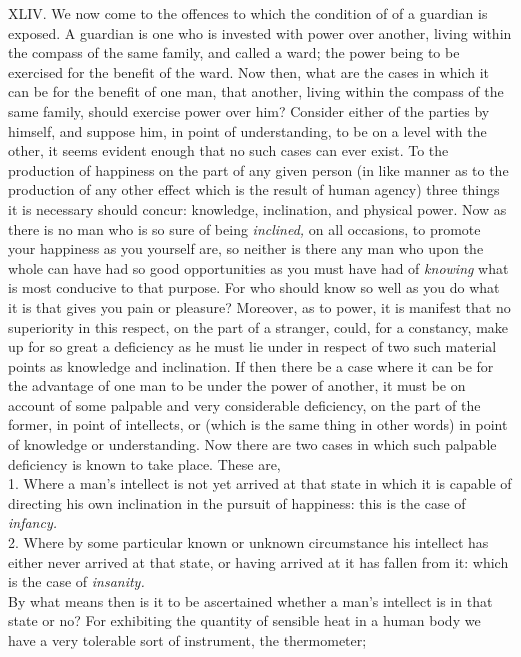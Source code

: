 \documentclass[12pt]{report}
\begin{document}
XLIV. We now come to the offences to which the condition of of a
guardian is exposed. A guardian is one who is invested with power over
another, living within the compass of the same family, and called a
ward; the power being to be exercised for the benefit of the ward. Now
then, what are the cases in which it can be for the benefit of one man,
that another, living within the compass of the same family, should
exercise power over him? Consider either of the parties by himself, and
suppose him, in point of understanding, to be on a level with the other,
it seems evident enough that no such cases can ever exist. To the
production of happiness on the part of any given person (in like manner
as to the production of any other effect which is the result of human
agency) three things it is necessary should concur: knowledge,
inclination, and physical power. Now as there is no man who is so sure
of being \emph{inclined,} on all occasions, to promote your happiness as
you yourself are, so neither is there any man who upon the whole can
have had so good opportunities as you must have had of \emph{knowing}
what is most conducive to that purpose. For who should know so well as
you do what it is that gives you pain or pleasure? Moreover, as to
power, it is manifest that no superiority in this respect, on the part
of a stranger, could, for a constancy, make up for so great a deficiency
as he must lie under in respect of two such material points as knowledge
and inclination. If then there be a case where it can be for the
advantage of one man to be under the power of another, it must be on
account of some palpable and very considerable deficiency, on the part
of the former, in point of intellects, or (which is the same thing in
other words) in point of knowledge or understanding. Now there are two
cases in which such palpable deficiency is known to take place. These
are,\\
1. Where a man's intellect is not yet arrived at that state in which it
is capable of directing his own inclination in the pursuit of happiness:
this is the case of \emph{infancy.}\\
2. Where by some particular known or unknown circumstance his intellect
has either never arrived at that state, or having arrived at it has
fallen from it: which is the case of \emph{insanity.} \emph{\\
}By what means then is it to be ascertained whether a man's intellect is
in that state or no? For exhibiting the quantity of sensible heat in a
human body we have a very tolerable sort of instrument, the thermometer;
\end{document}
